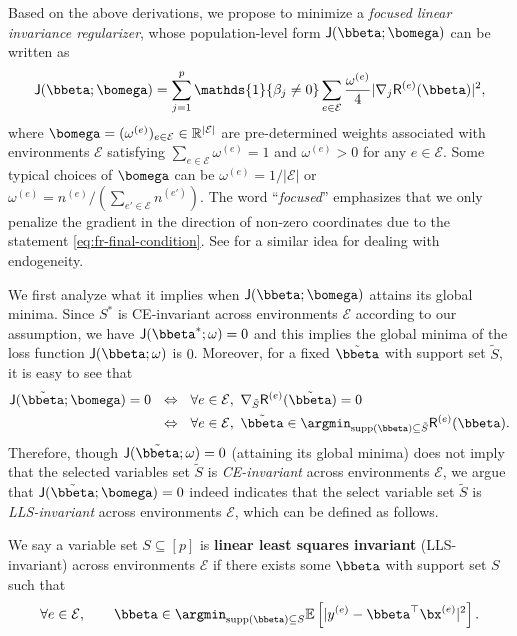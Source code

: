\documentclass[10pt]{article}
\numberwithin{equation}{section}
\newcommand*{\supp}{\mathrm{supp}}
\begin{document}
{Based on the above derivations, we propose to minimize a \emph{focused linear invariance regularizer}, whose population-level form $\mathsf{J}(\bbeta; \bomega)$ can be written as
\begin{align}
\label{eq:invariant-regularizer-population}
\mathsf{J}(\bbeta;\bomega) = \sum_{j=1}^p \mathds{1}\{\beta_j \neq 0\} \sum_{e\in \mathcal{E}} \frac{\omega^{(e)}}{4} |\nabla_j \mathsf{R}^{(e)}(\bbeta)|^2,
\end{align} where $\bomega = (\omega^{(e)})_{e\in \mathcal{E}} \in \mathbb{R}^{|\mathcal{E}|}$ are pre-determined weights associated with environments $\mathcal{E}$ satisfying $\sum_{e\in \mathcal{E}} \omega^{(e)}=1$ and $\omega^{(e)} > 0$ for any $e\in \mathcal{E}$. Some typical choices of $\bomega$ can be $\omega^{(e)} = 1/|\mathcal{E}|$ or $\omega^{(e)} = n^{(e)} / (\sum_{e'\in \mathcal{E}} n^{(e')})$. The word ``\emph{focused}'' emphasizes that we only penalize the gradient in the direction of non-zero coordinates due to the statement \eqref{eq:fr-final-condition}.  See \cite{fan2014endogeneity} for a similar idea for dealing with endogeneity.

We first analyze what it implies when $\mathsf{J}(\bbeta; \bomega)$ attains its global minima. Since $S^*$ is CE-invariant across environments $\mathcal{E}$ according to our assumption, we have $\mathsf{J}(\bbeta^*;\omega)=0$ and this implies the global minima of the loss function $\mathsf{J}(\bbeta;\omega)$ is $0$. Moreover, for a fixed $\tilde{\bbeta}$ with support set $\tilde{S}$, it is easy to see that
\begin{align*}
    \mathsf{J}(\tilde{\bbeta};\bomega) = 0 ~~&\Leftrightarrow~~ \forall e\in \mathcal{E}, ~\nabla_{\tilde{S}} \mathsf{R}^{(e)}(\tilde{\bbeta}) = 0 \\
    ~~&\Leftrightarrow ~~\forall e\in \mathcal{E}, ~\tilde{\bbeta} \in \argmin_{\supp(\bbeta) \subseteq \tilde{S}} \mathsf{R}^{(e)}(\bbeta).
\end{align*}
Therefore, though $\mathsf{J}(\tilde{\bbeta};\omega) = 0$ (attaining its global minima) does not imply that the selected variables set $\tilde{S}$ is \emph{CE-invariant} across environments $\mathcal{E}$, we argue that $\mathsf{J}(\tilde{\bbeta};\bomega) = 0$ indeed indicates that the select variable set $\tilde{S}$ is \emph{LLS-invariant} across environments $\mathcal{E}$, which can be defined as follows.
\begin{definition} We say a variable set $S \subseteq [p]$ is \textbf{linear least squares invariant} (LLS-invariant) across environments $\mathcal{E}$ if there exists some $\bbeta$ with support set $S$ such that
\begin{align}
\label{eq:lls-invariant}
    \forall e\in \mathcal{E}, ~~~~~~ \bbeta \in \argmin_{\supp(\bbeta) \subseteq S} \mathbb{E} \left[ |y^{(e)} - \bbeta^\top \bx^{(e)}|^2 \right].
\end{align}
\end{definition}

}
\end{document}

